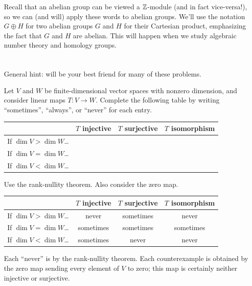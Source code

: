 \begin{abuse}
	Recall that an abelian group
	can be viewed a $\mathbb Z$-module (and in fact vice-versa!),
	so we can (and will) apply these words to abelian groups.
	We'll use the notation $G \oplus H$ for two abelian groups $G$ and $H$
	for their Cartesian product, emphasizing the fact that $G$ and $H$ are abelian.
	This will happen when we study algebraic number theory and homology groups.
\end{abuse}

\section{\problemhead}
General hint:
 will be your best friend
for many of these problems.

\begin{dproblem}
	Let $V$ and $W$ be finite-dimensional vector spaces
	with nonzero dimension, and consider linear maps $T \colon V \to W$.
	Complete the following table by writing
	``sometimes'', ``always'', or ``never'' for each entry.
	\begin{center}
	\begin{tabular}[h]{c|ccc}
		& $T$ injective & $T$ surjective & $T$ isomorphism \\ \hline
		If $\dim V > \dim W$\dots \\
		If $\dim V = \dim W$\dots \\
		If $\dim V < \dim W$\dots \\
	\end{tabular}
	\end{center}
	\begin{hint}
		Use the rank-nullity theorem.
		Also consider the zero map.
	\end{hint}
	\begin{sol}
		\begin{center}
		\begin{tabular}[h]{c|ccc}
		& $T$ injective & $T$ surjective & $T$ isomorphism \\ \hline
		If $\dim V > \dim W$\dots & never & sometimes & never\\
		If $\dim V = \dim W$\dots & sometimes & sometimes & sometimes \\
		If $\dim V < \dim W$\dots & sometimes & never & never \\
		\end{tabular}
		\end{center}
		Each ``never'' is by the rank-nullity theorem.
		Each counterexample is obtained by the zero map
		sending every element of $V$ to zero;
		this map is certainly neither injective or surjective.
	\end{sol}
\end{dproblem}

